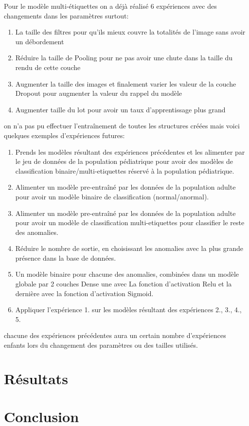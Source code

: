 Pour le modèle multi-étiquettes on a déjà réalisé 6 expériences avec des changements dans les paramètres surtout:
\begin{enumerate}
    \item La taille des filtres pour qu’ils mieux couvre la totalités de l’image sans avoir un débordement
    \item Réduire la taille de Pooling pour ne pas avoir une chute dans la taille du rendu de cette couche
    \item Augmenter la taille des images et finalement varier les valeur de la couche Dropout pour augmenter la valeur du rappel du modèle
    \item Augmenter taille du lot pour avoir un taux d'apprentissage plus grand
\end{enumerate}
on n'a pas pu effectuer l'entraînement de toutes les structures créées mais voici quelques exemples d'expériences futures:
\begin{enumerate}
    \item Prends les modèles résultant des expériences précédentes et les alimenter par le jeu de données de la population pédiatrique pour avoir des modèles de classification binaire/multi-etiquettes réservé à la population pédiatrique.
    \item Alimenter un modèle pre-entraîné par les données de la population adulte pour avoir un modèle binaire de classification (normal/anormal).
    \item Alimenter un modèle pre-entraîné par les données de la population adulte pour avoir un modèle de classification multi-etiquettes pour classifier le reste des anomalies.
    \item Réduire le nombre de sortie, en choisissant les anomalies avec la plus grande présence dans la base de données.
    \item Un modèle binaire pour chacune des anomalies, combinées dans un modèle globale par 2 couches Dense une avec La fonction d'activation Relu et la dernière avec la fonction d'activation Sigmoid.
    \item Appliquer l'expérience 1. sur les modèles résultant des expériences 2., 3., 4., 5.
\end{enumerate}

chacune des expériences précédentes aura un certain nombre d'expériences enfants lors du changement des paramètres ou des tailles utilisés.



\section{Résultats}

\section*{Conclusion}